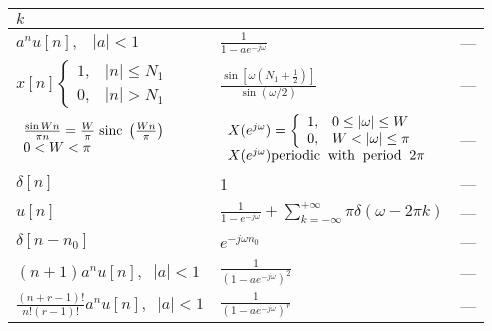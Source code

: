 \documentclass[12pt]{article}
\numberwithin{equation}{section}
\begin{document}
\begin{table}[htbp]
\begin{center}
\begin{tabular}{l|l|l}
$k$\\\hline
%
$\displaystyle a^{n}u[n],\;\;\;|a|<1$ & {\footnotesize
$\displaystyle \frac{1}{1-ae^{-j\omega}}$} &
\hspace{.25in}---\\\hline {\footnotesize $\displaystyle  x[n]
\left\{\begin{array}{ll}1, & |n|\leq N_{1}\\ 0, &
|n|>N_{1}\end{array}\right.$} & {\footnotesize $\displaystyle
\frac{\sin [\omega(N_{1}+\frac{1}{2})]}{\sin (\omega/2)}$} &
\hspace{.25in}
---\\\hline {\footnotesize $\displaystyle
\begin{array}{l}\frac{\sin Wn}{\pi n}=\frac{W}{\pi}\;{\rm
sinc}\;\left(\frac{Wn}{\pi}\right)\\ 0<W<\pi\end{array}$} &
{\footnotesize $\displaystyle  \begin{array}{l} X(e^{j\omega})
=\left\{\begin{array}{ll}1, & 0\leq |\omega|\leq W\\ 0, &
W<|\omega|\leq \pi\end{array}\right.\\X(e^{j\omega}) {\rm
periodic\;\;with\;\;period}\;\;2\pi\end{array}$} & \hspace{.25in}
---\\\hline
%
$\displaystyle \delta[n]$ & 1 & \hspace{.25in}
---\\\hline
%
$\displaystyle u[n]$ & {\footnotesize $\displaystyle
\frac{1}{1-e^{-j\omega}} +
\sum^{+\infty}_{k=-\infty}\pi\delta(\omega-2\pi k)$} &
\hspace{.25in} ---\\\hline $\displaystyle \delta[n-n_{0}]$ &
$\displaystyle e^{-j\omega n_{0}}$ & \hspace{.25in} ---\\\hline
$\displaystyle (n+1)a^{n}u[n],\;\;|a|<1$ & {\footnotesize
$\displaystyle \frac{1}{(1-ae^{-j\omega})^{2}}$} &\hspace{.25in}
---\\\hline {\footnotesize $\displaystyle
\frac{(n+r-1)!}{n!(r-1)!}a^{n}u[n],\;\;|a|<1$} & {\footnotesize
$\displaystyle \frac{1}{(1-ae^{-j\omega})^{r}}$}
&\hspace{.25in}---\\\hline
\end{tabular}
\end{center}
\end{table}
\clearpage
\end{document}
